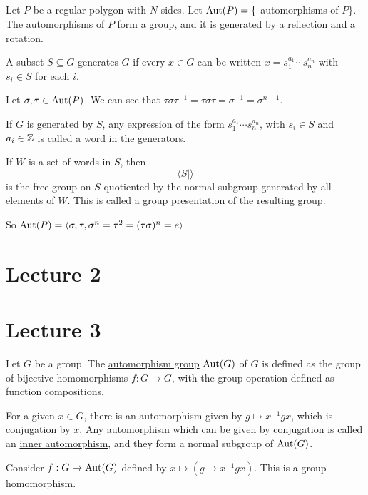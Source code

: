\documentclass[x11names,reqno,14pt]{extarticle}
\begin{document}
\subsection*{}

Let $P$ be a regular polygon with $N$ sides. Let ${\mathrm{Aut}}(P) = \{$ automorphisms of $P\}$. The automorphisms of $P$ form a group, and it is generated by a reflection and a rotation. 


A subset $S \subseteq G$ generates $G$ if every $x \in G$ can be written $x = s_1^{a_1}\cdots s_n^{a_n}$ with $s_i \in S$ for each $i$. 

Let $\sigma, \tau \in {\mathrm{Aut}}(P)$. We can see that $\tau\sigma\tau^{-1} = \tau\sigma\tau = \sigma^{-1} = \sigma^{n - 1}$. 

If $G$ is generated by $S$, any expression of the form $s_1^{a_1}\cdots s_n^{a_n}$, with $s_i \in S$ and $a_i \in \mathbb{Z}$ is called a word in the generators. 

If $W$ is a set of words in $S$, then 
\[
\langle S \mid \rangle
\]
is the free group on $S$ quotiented by the normal subgroup generated by all elements of $W$. This is called a group presentation of the resulting group. 

So ${\mathrm{Aut}}(P) = \langle \sigma, \tau, \sigma^n = \tau^2 = (\tau\sigma)^n = e\rangle$

\section*{Lecture 2}



\section*{Lecture 3}


Let $G$ be a group. The \underline{automorphism group} ${\mathrm{Aut}}(G)$ of $G$ is defined as the group of bijective homomorphisms $f:G\to G$, with the group operation defined as function compositions. 

For a given $x \in G$, there is an automorphism given by $g \mapsto x^{-1}gx$, which is conjugation by $x$. Any automorphism which can be given by conjugation is called an \underline{inner automorphism}, and they form a normal subgroup of ${\mathrm{Aut}}(G)$. 

\claim Consider $f:G\to{\mathrm{Aut}}(G)$ defined by $x \mapsto (g \mapsto x^{-1}gx)$. This is a group homomorphism. 
\end{document}
